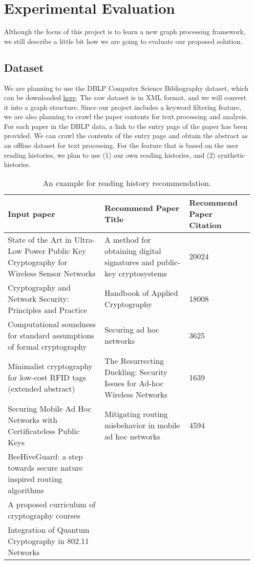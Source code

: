 \section{Experimental Evaluation}
%
Although the focus of this project is to learn a new graph processing framework, we still describe a little bit how we are going to evaluate our proposed solution.
%
\subsection{Dataset} \label{dataset}
%
We are planning to use the DBLP Computer Science Bibliography dataset, which can be downloaded \href{https://dblp.uni-trier.de/xml/}{\underline{here}}.
%
The raw dataset is in XML format, and we will convert it into a graph structure.
%
Since our project includes a keyword filtering feature, we are also planning to crawl the paper contents for text processing and analysis.
%
For each paper in the DBLP data, a link to the entry page of the paper has been provided.
%
We can crawl the contents of the entry page and obtain the abstract as an offline dataset for text processing.
%
For the feature that is based on the user reading histories, we plan to use (1) our own reading histories, and (2) synthetic histories.
%
\begin{table*}[ht]
	\centering
	\begin{tabular}{p{7cm}p{7cm}p{3cm}}
		\toprule
		\textbf{Input paper}		& \textbf{Recommend Paper Title} 		& \textbf{Recommend Paper Citation} 	\\ \midrule
		State of the Art in Ultra-Low Power Public Key Cryptography for Wireless Sensor Networks &A method for obtaining digital signatures and public-key cryptosystems	&20024\\
		Cryptography and Network Security: Principles and Practice				&Handbook of Applied Cryptography &18008\\
		Computational soundness for standard assumptions of formal cryptography				&Securing ad hoc networks &3625\\
		Minimalist cryptography for low-cost RFID tags (extended abstract)				&The Resurrecting Duckling: Security Issues for Ad-hoc Wireless Networks &1639\\
		Securing Mobile Ad Hoc Networks with Certificateless Public Keys				&Mitigating routing misbehavior in mobile ad hoc networks&4594\\
		BeeHiveGuard: a step towards secure nature inspired routing algorithms\\
		A proposed curriculum of cryptography courses\\
		Integration of Quantum Cryptography in 802.11 Networks\\
		\bottomrule
	\end{tabular}
	\vspace{3mm}
	\caption{An example for reading history recommendation. }
	\label{res:patternexp}
\end{table*}
%
